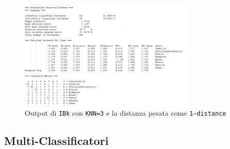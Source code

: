 \documentclass[a4paper,11pt,twoside,notitlepage,final]{scrartcl}
\begin{document}
\begin{figure}[H]
  \centering
  \includegraphics[width=0.75\textwidth]{fig/kNNWeighted.PNG}%
  \caption{Output di \texttt{IBk} con \texttt{KNN=3} e la distanza pesata come \texttt{1--distance}}%
  \label{fig:ibk:9}
\end{figure}

\subsection{Multi-Classificatori}
\end{document}
